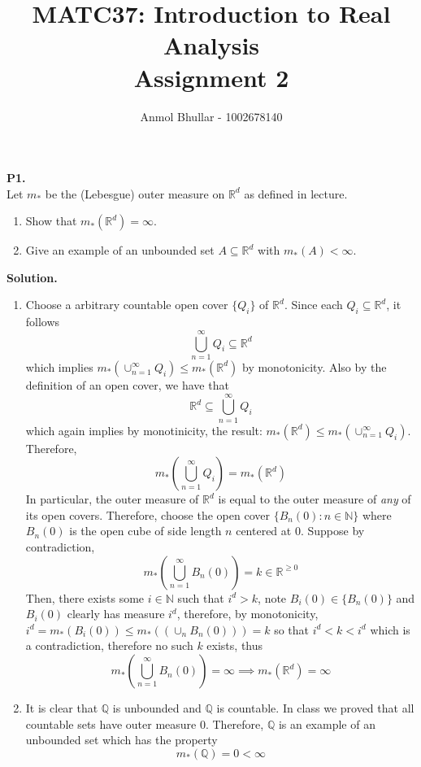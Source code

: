 \documentclass{article}
\title{MATC37: Introduction to Real Analysis\\
    Assignment 2}
\author{Anmol Bhullar - 1002678140}
\begin{document}
    \maketitle


    \textbf{P1.}\\

    Let $m_*$ be the (Lebesgue) outer measure on $\mathbb{R}^d$ as defined in lecture.
    \begin{enumerate}
        \item Show that $m_*(\mathbb{R}^d) = \infty$.
        \item Give an example of an unbounded set $A\subseteq\mathbb{R}^d$ with $m_*(A) < \infty$.
    \end{enumerate}

    \textbf{Solution.}
    \begin{enumerate}
        \item Choose a arbitrary countable open cover $\{Q_i\}$ of $\mathbb{R}^d$. Since each $Q_i\subseteq\mathbb{R}^d$, it follows
            \[ \bigcup_{n=1}^{\infty} Q_i \subseteq \mathbb{R}^d \]
            which implies $m_*(\cup_{n=1}^{\infty} Q_i) \leq m_*(\mathbb{R}^d)$ by monotonicity. Also by the definition of an open 
            cover, we have that
            \[ \mathbb{R}^d \subseteq \bigcup_{n=1}^{\infty} Q_i \]
            which again implies by monotinicity, the result: $m_*(\mathbb{R}^d)\leq m_*(\cup_{n=1}^{\infty} Q_i)$. Therefore,
            \[ m_*(\bigcup_{n=1}^{\infty} Q_i) = m_*(\mathbb{R}^d) \]
            In particular, the outer measure of $\mathbb{R}^d$ is equal to the outer measure of \textit{any} of its open covers.
            Therefore, choose the open cover $\{B_n(0): n\in\mathbb{N}\}$ where $B_n(0)$ is the open cube of side length $n$
            centered at 0. Suppose by contradiction,
            \[ m_*(\bigcup_{n=1}^{\infty} B_n(0)) = k\in\mathbb{R}^{\geq 0} \]
            Then, there exists some $i\in\mathbb{N}$ such that $i^d > k$, note $B_i(0)\in\{B_n(0)\}$ and $B_i(0)$ clearly has
            measure $i^d$, therefore, by monotonicity, $i^d = m_*(B_i(0)) \leq m_*((\cup_n B_n(0))) = k$ so that $i^d < k < i^d$
            which is a contradiction, therefore no such $k$ exists, thus
            \[ m_*(\bigcup_{n=1}^{\infty} B_n(0)) = \infty \implies m_*(\mathbb{R}^d) = \infty \]
        \item It is clear that $\mathbb{Q}$ is unbounded and $\mathbb{Q}$ is countable. In class we proved that all countable
            sets have outer measure 0. Therefore, $\mathbb{Q}$ is an example of an unbounded set which has the property
            \[ m_*(\mathbb{Q}) = 0 < \infty \]
    \end{enumerate}
\end{document}

